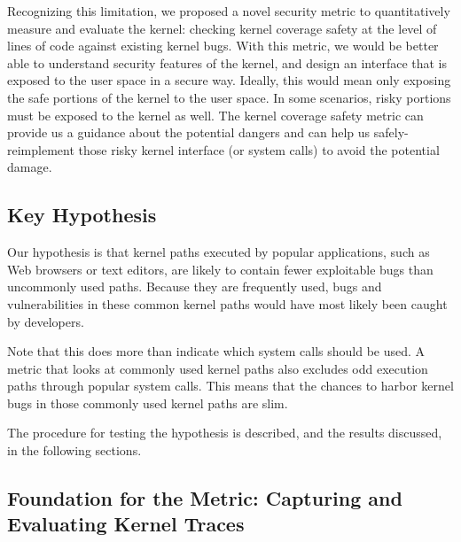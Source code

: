 Recognizing this limitation, we proposed a novel security metric to
quantitatively measure and evaluate the kernel: 
checking kernel coverage safety at the level of lines of code against
existing kernel bugs. 
With this metric, we would be better able to understand security features
of the kernel, 
and design an interface that is exposed to the user space in a secure way.
Ideally, 
this would mean only exposing the safe portions of the kernel to the user
space. 
In some scenarios, risky portions must be exposed to the kernel as
well. 
The kernel coverage safety metric %
 can provide us a guidance 
about the potential dangers and 
can help us safely-reimplement those risky kernel interface (or system
calls) to avoid the potential damage.



\subsection{Key Hypothesis}

Our hypothesis is that kernel paths executed by popular applications, 
such as Web browsers or text editors, are likely to contain fewer
exploitable bugs 
than uncommonly used paths. %
Because they are frequently used, bugs and vulnerabilities in these common kernel paths
would have most likely been caught by developers. 

Note that this does more than indicate which system calls should be used. 
A metric that looks at commonly used kernel paths also excludes odd execution paths 
through popular system calls. 
This means that the chances to harbor kernel bugs in those commonly used
kernel paths are slim.

The procedure for testing the hypothesis is described, and the results
discussed, in the following sections. 

\subsection{Foundation for the Metric: Capturing and Evaluating Kernel Traces}


